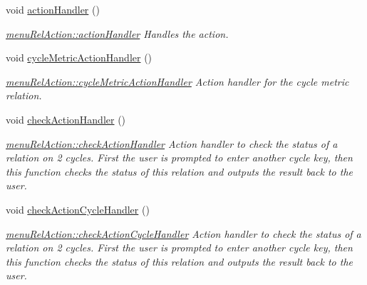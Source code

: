 \begin{DoxyCompactItemize}
\item 
void \mbox{\hyperlink{classmenu_rel_action_a23b63e5bdb79e12f74bd1d33a53fb6e0}{action\+Handler}} ()
\begin{DoxyCompactList}\small\item\em \mbox{\hyperlink{classmenu_rel_action_a23b63e5bdb79e12f74bd1d33a53fb6e0}{menu\+Rel\+Action\+::action\+Handler}} Handles the action. \end{DoxyCompactList}\item 
void \mbox{\hyperlink{classmenu_rel_action_adbd43b99466f9ad2cde1934e1599ae4c}{cycle\+Metric\+Action\+Handler}} ()
\begin{DoxyCompactList}\small\item\em \mbox{\hyperlink{classmenu_rel_action_adbd43b99466f9ad2cde1934e1599ae4c}{menu\+Rel\+Action\+::cycle\+Metric\+Action\+Handler}} Action handler for the cycle metric relation. \end{DoxyCompactList}\item 
\mbox{\label{classmenu_rel_action_a1535eb0d2ad06bd4d44f3de8761841b2}} 
void \mbox{\hyperlink{classmenu_rel_action_a1535eb0d2ad06bd4d44f3de8761841b2}{check\+Action\+Handler}} ()
\begin{DoxyCompactList}\small\item\em \mbox{\hyperlink{classmenu_rel_action_a1535eb0d2ad06bd4d44f3de8761841b2}{menu\+Rel\+Action\+::check\+Action\+Handler}} Action handler to check the status of a relation on 2 cycles. First the user is prompted to enter another cycle key, then this function checks the status of this relation and outputs the result back to the user. \end{DoxyCompactList}\item 
\mbox{\label{classmenu_rel_action_a8d79623cfe8711e62c6f4f28d8d4c33a}} 
void \mbox{\hyperlink{classmenu_rel_action_a8d79623cfe8711e62c6f4f28d8d4c33a}{check\+Action\+Cycle\+Handler}} ()
\begin{DoxyCompactList}\small\item\em \mbox{\hyperlink{classmenu_rel_action_a8d79623cfe8711e62c6f4f28d8d4c33a}{menu\+Rel\+Action\+::check\+Action\+Cycle\+Handler}} Action handler to check the status of a relation on 2 cycles. First the user is prompted to enter another cycle key, then this function checks the status of this relation and outputs the result back to the user. \end{DoxyCompactList}\item 

\end{DoxyCompactItemize}
